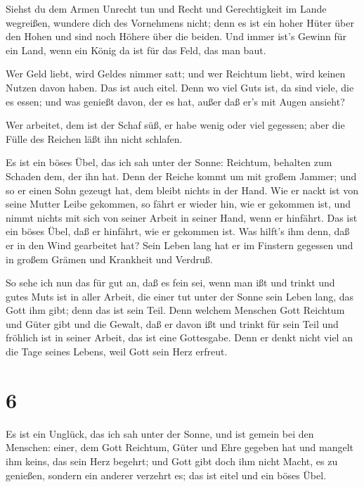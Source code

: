  Siehst du dem Armen Unrecht tun und Recht und Gerechtigkeit
im Lande wegreißen, wundere dich des Vornehmens nicht; denn es ist ein
hoher Hüter über den Hohen und sind noch Höhere über die beiden.
 Und immer ist's Gewinn für ein Land, wenn ein König da ist
für das Feld, das man baut.

 Wer Geld liebt, wird Geldes nimmer satt; und wer Reichtum
liebt, wird keinen Nutzen davon haben. Das ist auch eitel. 
Denn wo viel Guts ist, da sind viele, die es essen; und was genießt
davon, der es hat, außer daß er's mit Augen ansieht?

 Wer arbeitet, dem ist der Schaf süß, er habe wenig oder
viel gegessen; aber die Fülle des Reichen läßt ihn nicht schlafen.

 Es ist ein böses Übel, das ich sah unter der Sonne:
Reichtum, behalten zum Schaden dem, der ihn hat.  Denn der
Reiche kommt um mit großem Jammer; und so er einen Sohn gezeugt hat, dem
bleibt nichts in der Hand.  Wie er nackt ist von seine
Mutter Leibe gekommen, so fährt er wieder hin, wie er gekommen ist, und
nimmt nichts mit sich von seiner Arbeit in seiner Hand, wenn er
hinfährt.  Das ist ein böses Übel, daß er hinfährt, wie er
gekommen ist. Was hilft's ihm denn, daß er in den Wind gearbeitet hat?
 Sein Leben lang hat er im Finstern gegessen und in großem
Grämen und Krankheit und Verdruß.

 So sehe ich nun das für gut an, daß es fein sei, wenn man
ißt und trinkt und gutes Muts ist in aller Arbeit, die einer tut unter
der Sonne sein Leben lang, das Gott ihm gibt; denn das ist sein Teil.
 Denn welchem Menschen Gott Reichtum und Güter gibt und die
Gewalt, daß er davon ißt und trinkt für sein Teil und fröhlich ist in
seiner Arbeit, das ist eine Gottesgabe.  Denn er denkt
nicht viel an die Tage seines Lebens, weil Gott sein Herz erfreut.

\hypertarget{section-5}{%
\section{6}\label{section-5}}

 Es ist ein Unglück, das ich sah unter der Sonne, und ist
gemein bei den Menschen:  einer, dem Gott Reichtum, Güter
und Ehre gegeben hat und mangelt ihm keins, das sein Herz begehrt; und
Gott gibt doch ihm nicht Macht, es zu genießen, sondern ein anderer
verzehrt es; das ist eitel und ein böses Übel.

